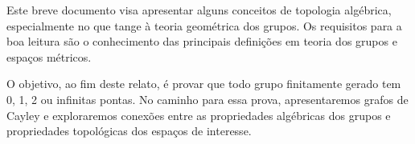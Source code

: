 Este breve documento visa apresentar alguns conceitos de topologia algébrica, especialmente no que tange à teoria geométrica dos grupos. Os requisitos para a boa leitura são o conhecimento das principais definições em teoria dos grupos e espaços métricos.

O objetivo, ao fim deste relato, é provar que todo grupo finitamente gerado tem 0, 1, 2 ou infinitas pontas. No caminho para essa prova, apresentaremos grafos de Cayley e exploraremos conexões entre as propriedades algébricas dos grupos e propriedades topológicas dos espaços de interesse.